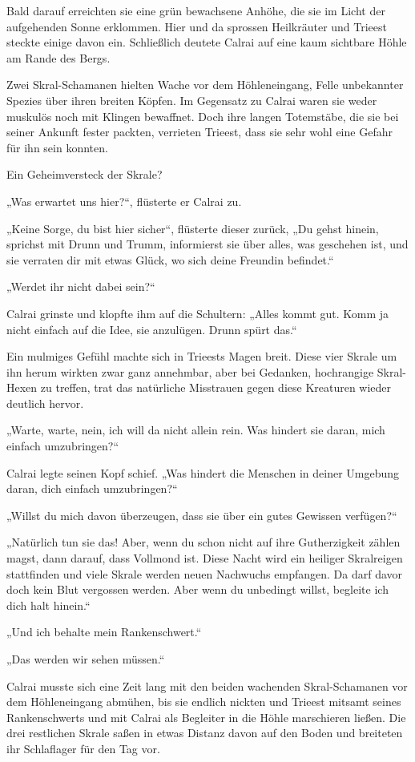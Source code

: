 Bald darauf erreichten sie eine grün bewachsene Anhöhe, die sie im Licht der aufgehenden Sonne erklommen. Hier und da sprossen Heilkräuter und Trieest steckte einige davon ein. Schließlich deutete Calrai auf eine kaum sichtbare Höhle am Rande des Bergs.

Zwei Skral-Schamanen hielten Wache vor dem Höhleneingang, Felle unbekannter Spezies über ihren breiten Köpfen. Im Gegensatz zu Calrai waren sie weder muskulös noch mit Klingen bewaffnet. Doch ihre langen Totemstäbe, die sie bei seiner Ankunft fester packten, verrieten Trieest, dass sie sehr wohl eine Gefahr für ihn sein konnten.

Ein Geheimversteck der Skrale?

„Was erwartet uns hier?“, flüsterte er Calrai zu.

„Keine Sorge, du bist hier sicher“, flüsterte dieser zurück, „Du gehst hinein, sprichst mit Drunn und Trumm, informierst sie über alles, was geschehen ist, und sie verraten dir mit etwas Glück, wo sich deine Freundin befindet.“

„Werdet ihr nicht dabei sein?“

Calrai grinste und klopfte ihm auf die Schultern: „Alles kommt gut. Komm ja nicht einfach auf die Idee, sie anzulügen. Drunn spürt das.“

Ein mulmiges Gefühl machte sich in Trieests Magen breit. Diese vier Skrale um ihn herum wirkten zwar ganz annehmbar, aber bei Gedanken, hochrangige Skral-Hexen zu treffen, trat das natürliche Misstrauen gegen diese Kreaturen wieder deutlich hervor.

„Warte, warte, nein, ich will da nicht allein rein. Was hindert sie daran, mich einfach umzubringen?“

Calrai legte seinen Kopf schief. „Was hindert die Menschen in deiner Umgebung daran, dich einfach umzubringen?“

„Willst du mich davon überzeugen, dass sie über ein gutes Gewissen verfügen?“

„Natürlich tun sie das! Aber, wenn du schon nicht auf ihre Gutherzigkeit zählen magst, dann darauf, dass Vollmond ist. Diese Nacht wird ein heiliger Skralreigen stattfinden und viele Skrale werden neuen Nachwuchs empfangen. Da darf davor doch kein Blut vergossen werden. Aber wenn du unbedingt willst, begleite ich dich halt hinein.“

„Und ich behalte mein Rankenschwert.“

„Das werden wir sehen müssen.“

Calrai musste sich eine Zeit lang mit den beiden wachenden Skral-Schamanen vor dem Höhleneingang abmühen, bis sie endlich nickten und Trieest mitsamt seines Rankenschwerts und mit Calrai als Begleiter in die Höhle marschieren ließen. Die drei restlichen Skrale saßen in etwas Distanz davon auf den Boden und breiteten ihr Schlaflager für den Tag vor.

